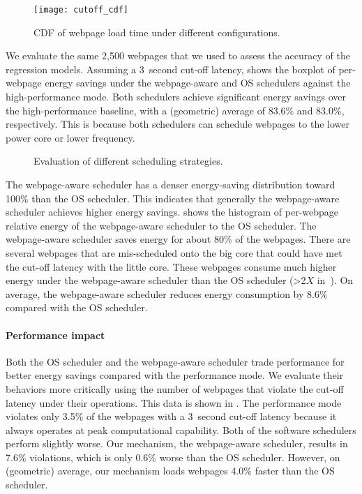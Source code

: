 \begin{figure}[t]
\centering
\texttt{[image: cutoff\_cdf]}
\caption{CDF of webpage load time under different configurations.}
\label{fig:cutoff_cdf}
\end{figure}

We evaluate the same 2,500 webpages that we used to assess the accuracy of the regression models. Assuming a 3~second cut-off latency,  shows the boxplot of per-webpage energy savings under the webpage-aware and OS schedulers against the high-performance mode. Both schedulers achieve significant energy savings over the high-performance baseline, with a (geometric) average of 83.6\% and 83.0\%, respectively. This is because both schedulers can schedule webpages to the lower power core or lower frequency.

\begin{figure}[t]
\hspace*{15pt}
\caption{Evaluation of different scheduling strategies.}
\label{fig:sched_results}
\end{figure}

The webpage-aware scheduler has a denser energy-saving distribution toward 100\% than the OS scheduler. This indicates that generally the webpage-aware scheduler achieves higher energy savings.  shows the histogram of per-webpage relative energy of the webpage-aware scheduler to the OS scheduler. The webpage-aware scheduler saves energy for about 80\% of the webpages. There are several webpages that are mis-scheduled onto the big core that could have met the cut-off latency with the little core. These webpages consume much higher energy under the webpage-aware scheduler than the OS scheduler (\textgreater 2$X$ in~).  On average, the webpage-aware scheduler reduces energy consumption by 8.6\% compared with the OS scheduler.

\paragraph{Performance impact} Both the OS scheduler and the webpage-aware scheduler trade performance for better energy savings compared with the performance mode. We evaluate their behaviors more critically using the number of webpages that violate the cut-off latency under their operations. This data is shown in . The performance mode violates only 3.5\% of the webpages with a 3~second cut-off latency because it always operates at peak computational capability. Both of the software schedulers perform slightly worse. Our mechanism, the webpage-aware scheduler, results in 7.6\% violations, which is only 0.6\% worse than the OS scheduler. However, on (geometric) average, our mechanism loads webpages 4.0\% faster than the OS scheduler.

